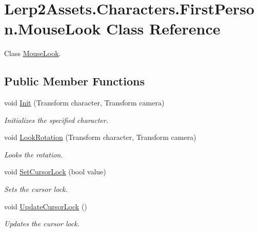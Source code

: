 \hypertarget{class_lerp2_assets_1_1_characters_1_1_first_person_1_1_mouse_look}{}\section{Lerp2\+Assets.\+Characters.\+First\+Person.\+Mouse\+Look Class Reference}
\label{class_lerp2_assets_1_1_characters_1_1_first_person_1_1_mouse_look}


Class \hyperlink{class_lerp2_assets_1_1_characters_1_1_first_person_1_1_mouse_look}{Mouse\+Look}.  


\subsection*{Public Member Functions}
\begin{DoxyCompactItemize}
\item 
void \hyperlink{class_lerp2_assets_1_1_characters_1_1_first_person_1_1_mouse_look_ae2ecd201284cf4f8496b43f9a26df3ca}{Init} (Transform character, Transform camera)
\begin{DoxyCompactList}\small\item\em Initializes the specified character. \end{DoxyCompactList}\item 
void \hyperlink{class_lerp2_assets_1_1_characters_1_1_first_person_1_1_mouse_look_a27adcf9324c0021d2ac0fd7c11b03846}{Look\+Rotation} (Transform character, Transform camera)
\begin{DoxyCompactList}\small\item\em Looks the rotation. \end{DoxyCompactList}\item 
void \hyperlink{class_lerp2_assets_1_1_characters_1_1_first_person_1_1_mouse_look_a85234aa327d3d1d260ff4e70d2ee16a9}{Set\+Cursor\+Lock} (bool value)
\begin{DoxyCompactList}\small\item\em Sets the cursor lock. \end{DoxyCompactList}\item 
void \hyperlink{class_lerp2_assets_1_1_characters_1_1_first_person_1_1_mouse_look_a872eab43940083d9712716a7d447091e}{Update\+Cursor\+Lock} ()
\begin{DoxyCompactList}\small\item\em Updates the cursor lock. \end{DoxyCompactList}\end{DoxyCompactItemize}
